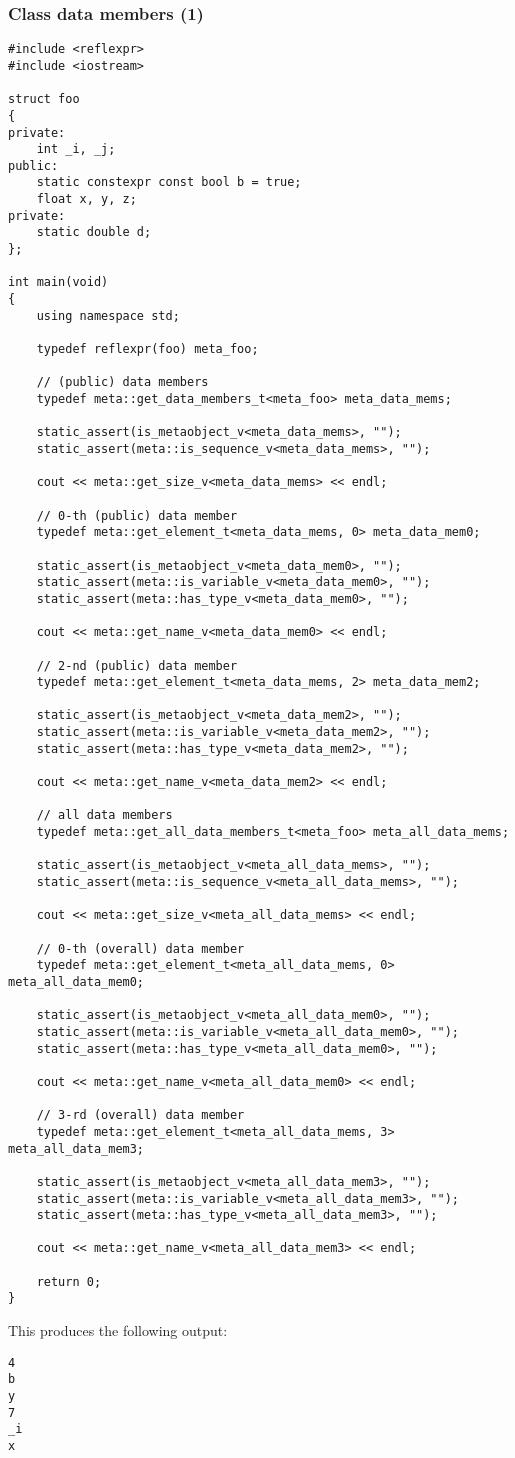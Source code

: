 \subsubsection{Class data members (1)}

\begin{verbatim}
#include <reflexpr>
#include <iostream>

struct foo
{
private:
	int _i, _j;
public:
	static constexpr const bool b = true;
	float x, y, z;
private:
	static double d;
};

int main(void)
{
	using namespace std;

	typedef reflexpr(foo) meta_foo;

	// (public) data members
	typedef meta::get_data_members_t<meta_foo> meta_data_mems;

	static_assert(is_metaobject_v<meta_data_mems>, "");
	static_assert(meta::is_sequence_v<meta_data_mems>, "");

	cout << meta::get_size_v<meta_data_mems> << endl;

	// 0-th (public) data member
	typedef meta::get_element_t<meta_data_mems, 0> meta_data_mem0;

	static_assert(is_metaobject_v<meta_data_mem0>, "");
	static_assert(meta::is_variable_v<meta_data_mem0>, "");
	static_assert(meta::has_type_v<meta_data_mem0>, "");

	cout << meta::get_name_v<meta_data_mem0> << endl;

	// 2-nd (public) data member
	typedef meta::get_element_t<meta_data_mems, 2> meta_data_mem2;

	static_assert(is_metaobject_v<meta_data_mem2>, "");
	static_assert(meta::is_variable_v<meta_data_mem2>, "");
	static_assert(meta::has_type_v<meta_data_mem2>, "");

	cout << meta::get_name_v<meta_data_mem2> << endl;

	// all data members
	typedef meta::get_all_data_members_t<meta_foo> meta_all_data_mems;

	static_assert(is_metaobject_v<meta_all_data_mems>, "");
	static_assert(meta::is_sequence_v<meta_all_data_mems>, "");

	cout << meta::get_size_v<meta_all_data_mems> << endl;

	// 0-th (overall) data member
	typedef meta::get_element_t<meta_all_data_mems, 0> meta_all_data_mem0;

	static_assert(is_metaobject_v<meta_all_data_mem0>, "");
	static_assert(meta::is_variable_v<meta_all_data_mem0>, "");
	static_assert(meta::has_type_v<meta_all_data_mem0>, "");

	cout << meta::get_name_v<meta_all_data_mem0> << endl;

	// 3-rd (overall) data member
	typedef meta::get_element_t<meta_all_data_mems, 3> meta_all_data_mem3;

	static_assert(is_metaobject_v<meta_all_data_mem3>, "");
	static_assert(meta::is_variable_v<meta_all_data_mem3>, "");
	static_assert(meta::has_type_v<meta_all_data_mem3>, "");

	cout << meta::get_name_v<meta_all_data_mem3> << endl;

	return 0;
}

\end{verbatim}

This produces the following output:

\begin{verbatim}
4
b
y
7
_i
x
\end{verbatim}
